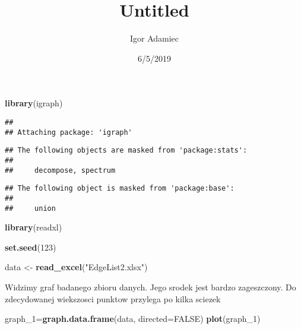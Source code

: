 \documentclass[]{article}
\title{Untitled}
\author{Igor Adamiec}
\date{6/5/2019}
\newenvironment{Shaded}{\begin{snugshade}}{\end{snugshade}}
\newcommand{\KeywordTok}[1]{\textcolor[rgb]{0.13,0.29,0.53}{\textbf{#1}}}
\newcommand{\DataTypeTok}[1]{\textcolor[rgb]{0.13,0.29,0.53}{#1}}
\newcommand{\DecValTok}[1]{\textcolor[rgb]{0.00,0.00,0.81}{#1}}
\newcommand{\StringTok}[1]{\textcolor[rgb]{0.31,0.60,0.02}{#1}}
\newcommand{\OtherTok}[1]{\textcolor[rgb]{0.56,0.35,0.01}{#1}}
\newcommand{\NormalTok}[1]{#1}
\begin{document}
\maketitle

\begin{Shaded}
\begin{Highlighting}[]
\KeywordTok{library}\NormalTok{(igraph)}
\end{Highlighting}
\end{Shaded}

\begin{verbatim}
## 
## Attaching package: 'igraph'
\end{verbatim}

\begin{verbatim}
## The following objects are masked from 'package:stats':
## 
##     decompose, spectrum
\end{verbatim}

\begin{verbatim}
## The following object is masked from 'package:base':
## 
##     union
\end{verbatim}

\begin{Shaded}
\begin{Highlighting}[]
\KeywordTok{library}\NormalTok{(readxl)}
\end{Highlighting}
\end{Shaded}

\begin{Shaded}
\begin{Highlighting}[]
\KeywordTok{set.seed}\NormalTok{(}\DecValTok{123}\NormalTok{)}
\end{Highlighting}
\end{Shaded}

\begin{Shaded}
\begin{Highlighting}[]
\NormalTok{data <-}\StringTok{ }\KeywordTok{read_excel}\NormalTok{(}\StringTok{"EdgeList2.xlsx"}\NormalTok{)}
\end{Highlighting}
\end{Shaded}

Widzimy graf badanego zbioru danych. Jego srodek jest bardzo
zageszczony. Do zdecydowanej wiekszosci punktow przylega po kilka
sciezek

\begin{Shaded}
\begin{Highlighting}[]
\NormalTok{graph_}\DecValTok{1}\NormalTok{=}\KeywordTok{graph.data.frame}\NormalTok{(data, }\DataTypeTok{directed=}\OtherTok{FALSE}\NormalTok{)}
\KeywordTok{plot}\NormalTok{(graph_}\DecValTok{1}\NormalTok{)}
\end{Highlighting}
\end{Shaded}
\end{document}

